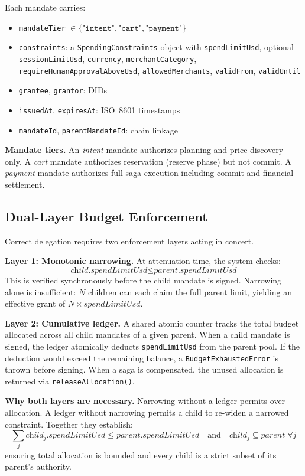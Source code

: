 \documentclass[conference]{IEEEtran}
\begin{document}
Each mandate carries:
\begin{itemize}
  \item \texttt{mandateTier} $\in \{\texttt{"intent"},
        \texttt{"cart"}, \texttt{"payment"}\}$
  \item \texttt{constraints}: a \texttt{SpendingConstraints} object
        with \texttt{spendLimitUsd}, optional \texttt{sessionLimitUsd},
        \texttt{currency}, \texttt{merchantCategory},
        \texttt{requireHumanApprovalAboveUsd},
        \texttt{allowedMerchants}, \texttt{validFrom}, \texttt{validUntil}
  \item \texttt{grantee}, \texttt{grantor}: DIDs
  \item \texttt{issuedAt}, \texttt{expiresAt}: ISO~8601 timestamps
  \item \texttt{mandateId}, \texttt{parentMandateId}: chain linkage
\end{itemize}

\textbf{Mandate tiers.}  An \emph{intent} mandate authorizes planning
and price discovery only.  A \emph{cart} mandate authorizes reservation
(reserve phase) but not commit.  A \emph{payment} mandate authorizes
full saga execution including commit and financial settlement.

\subsection{Dual-Layer Budget Enforcement}

Correct delegation requires two enforcement layers acting
in concert.

\textbf{Layer 1: Monotonic narrowing.}  At attenuation time, the
system checks:
\[
  \textit{child.spendLimitUsd} \leq \textit{parent.spendLimitUsd}
\]
This is verified synchronously before the child mandate is signed.
Narrowing alone is insufficient: $N$ children can each claim the
full parent limit, yielding an effective grant of
$N \times \textit{spendLimitUsd}$.

\textbf{Layer 2: Cumulative ledger.}  A shared atomic counter tracks
the total budget allocated across all child mandates of a given parent.
When a child mandate is signed, the ledger atomically deducts
\texttt{spendLimitUsd} from the parent pool.  If the deduction would
exceed the remaining balance, a \texttt{BudgetExhaustedError} is
thrown before signing.  When a saga is compensated, the unused
allocation is returned via \texttt{releaseAllocation()}.

\textbf{Why both layers are necessary.}  Narrowing without a ledger
permits over-allocation.  A ledger without narrowing permits a child
to re-widen a narrowed constraint.  Together they establish:
\[
  \sum_j \textit{child}_j.\textit{spendLimitUsd}
  \leq \textit{parent.spendLimitUsd}
  \quad \text{and} \quad
  \textit{child}_j \subseteq \textit{parent} \;\forall j
\]
ensuring total allocation is bounded and every child is a strict
subset of its parent's authority.
\end{document}
